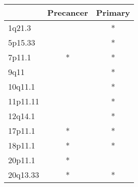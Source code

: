 \begin{tabular}{lcc}
\toprule
{} & Precancer & Primary \\
\midrule
1q21.3   &           &       * \\
5p15.33  &           &       * \\
7p11.1   &         * &       * \\
9q11     &           &       * \\
10q11.1  &           &       * \\
11p11.11 &           &       * \\
12q14.1  &           &       * \\
17p11.1  &         * &       * \\
18p11.1  &         * &       * \\
20p11.1  &         * &         \\
20q13.33 &         * &       * \\
\bottomrule
\end{tabular}
